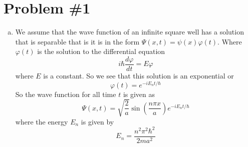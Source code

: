 \documentclass[11pt]{article}
\numberwithin{equation}{section}
\begin{document}


\section{Problem \#1}
\begin{enumerate}[(a)]
\item
We assume that the wave function of an infinite square well has a solution that is separable that is it is in the form $\Psi(x,t) = \psi(x)\varphi(t)$. Where $\varphi(t)$ is the solution to the differential equation 
$$i\hbar\frac{d\varphi}{dt} = E\varphi$$
where $E$ is a constant. So we see that this solution is an exponential or
$$\varphi(t) = e^{-iE_nt/\hbar}$$
So the wave function for all time $t$ is given as
$$\Psi(x,t) = \sqrt{\frac{2}{a}}\sin\left(\frac{n\pi x}{a}\right)e^{-iE_nt/\hbar}$$
where the energy $E_n$ is given by
$$E_n = \frac{n^2\pi^2\hbar^2}{2ma^2}$$


\end{enumerate}
\end{document}
